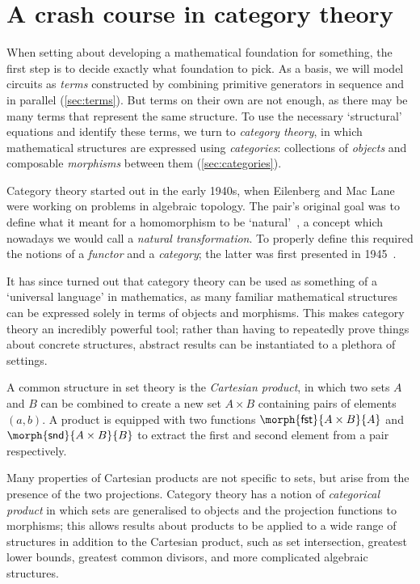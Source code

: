 \chapter{A crash course in category theory}

When setting about developing a mathematical foundation for something,
the first step is to decide exactly what foundation to pick.
As a basis, we will model circuits as \emph{terms} constructed by combining
primitive generators in sequence and in parallel (\cref{sec:terms}).
But terms on their own are not enough, as there may be many terms that represent
the same structure.
To use the necessary `structural' equations and identify these terms, we turn
to \emph{category theory}, in which mathematical structures are expressed using
\emph{categories}: collections of \emph{objects} and composable \emph{morphisms}
between them (\cref{sec:categories}).

Category theory started out in the early 1940s, when Eilenberg and Mac Lane
were working on problems in algebraic topology.
The pair's original goal was to define what it meant for a homomorphism to be
`natural'~\cite{eilenberg1942natural}, a concept which nowadays we would call a
\emph{natural transformation}.
To properly define this required the notions of a \emph{functor}
and a \emph{category}; the latter was first presented in
1945~\cite{eilenberg1945general}.

It has since turned out that category theory can be used as something of a
`universal language' in mathematics, as many familiar mathematical structures
can be expressed solely in terms of objects and morphisms.
This makes category theory an incredibly powerful tool; rather than having to
repeatedly prove things about concrete structures, abstract results can be
instantiated to a plethora of settings.

\begin{example}
    A common structure in set theory is the \emph{Cartesian product}, in
    which two sets \(A\) and \(B\) can be combined to create a new set
    \(A \times B\) containing pairs of elements \((a,b)\).
    A product is equipped with two functions
    \(\morph{\mathsf{fst}}{A \times B}{A}\) and
    \(\morph{\mathsf{snd}}{A \times B}{B}\) to extract the first and second
    element from a pair respectively.

    Many properties of Cartesian products are not specific to sets,
    but arise from the presence of the two projections.
    Category theory has a notion of \emph{categorical product} in which
    sets are generalised to objects and the projection functions to morphisms;
    this allows results about products to be applied to a wide range of
    structures in addition to the Cartesian product, such as set intersection,
    greatest lower bounds, greatest common divisors, and more complicated
    algebraic structures.
\end{example}

